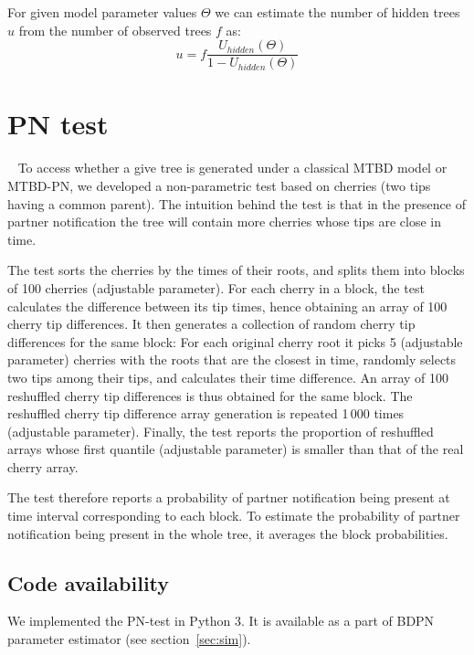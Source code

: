 \documentclass[a4paper,10pt]{article}
\begin{document}
For given model parameter values $\Theta$ we can estimate the number of hidden trees $u$ from the number of observed trees $f$ as:
\begin{equation}
u = f \frac{U_{hidden}(\Theta)}{1 - U_{hidden}(\Theta)}\label{eq:u} 
\end{equation}


\section{PN test}~\label{sec:test}
To access whether a give tree is generated under a classical MTBD model or MTBD-PN, we developed a non-parametric test based on cherries (two tips having a common parent). 
The intuition behind the test is that in the presence of partner notification the tree will contain more cherries whose tips are close in time. 

The test sorts the cherries by the times of their roots, and splits them into blocks of 100 cherries (adjustable parameter). For each cherry in a block, the test calculates the difference between its tip times, hence obtaining an array of 100 cherry tip differences. It then generates a collection of random cherry tip differences for the same block: For each original cherry root it picks 5 (adjustable parameter) cherries with the roots that are the closest in time, randomly selects two tips among their tips, and calculates their time difference. An array of 100 reshuffled cherry tip differences is thus obtained for the same block. The reshuffled cherry tip difference array generation is repeated 1\,000 times (adjustable parameter). Finally, the test reports the proportion of reshuffled arrays whose first quantile (adjustable parameter) is smaller than that of the real cherry array. 

The test therefore reports a probability of partner notification being present at time interval corresponding to each block. To estimate the probability of partner notification being present in the whole tree, it averages the block probabilities. 

\subsection*{Code availability}
We implemented the PN-test in Python 3. It is available as a part of BDPN parameter estimator (see section~\ref{sec:sim}).
\end{document}
